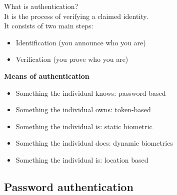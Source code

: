 \documentclass[10pt,a4paper]{book}
\begin{document}
What is authentication?\\
It is the process of verifying a claimed identity.\\
It consists of two main steps:
\begin{itemize}
\item Identification (you announce who you are)
\item Verification (you prove who you are)
\end{itemize}
\textbf{Means of authentication}
\begin{itemize}
\item Something the individual knows: password-based
\item Something the individual owns: token-based
\item Something the individual is: static biometric
\item Something the individual does: dynamic biometrics
\item Something the individual is: location based
\end{itemize}

\subsection{Password authentication}
\end{document}
